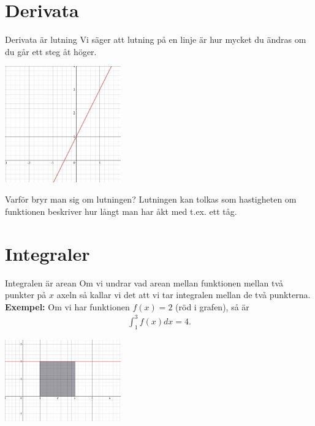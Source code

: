\documentclass{beamer}
\begin{document}
\section*{Derivata}
\label{sec:orgafbd31c}
\begin{frame}{Derivata är lutning}
Vi säger att lutning på en linje är hur mycket du ändras om du
går ett steg åt höger.
\begin{center}
\includegraphics[angle=0,width=5cm]{./img/2x.png}
\end{center}
\end{frame}


\begin{frame}{Varför bryr man sig om lutningen?}
Lutningen kan tolkas som hastigheten om funktionen beskriver hur långt man har
åkt med t.ex. ett tåg.
\end{frame}


\section*{Integraler}
\label{sec:orgd645837}
\begin{frame}{Integralen är arean}
Om vi undrar vad arean mellan funktionen mellan två punkter
på \(x\) axeln så kallar vi det att vi tar integralen mellan de två punkterna.
\newline
\textbf{Exempel:}
Om vi har funktionen \(f(x) = 2\) (röd i grafen), så är
\begin{align*}
\int_{ 1 }^{ 3} f(x) dx = 4
.
\end{align*}

\begin{center}
\includegraphics[angle=0,width=5cm]{./img/integral.png}
\end{center}
\end{frame}
\end{document}
